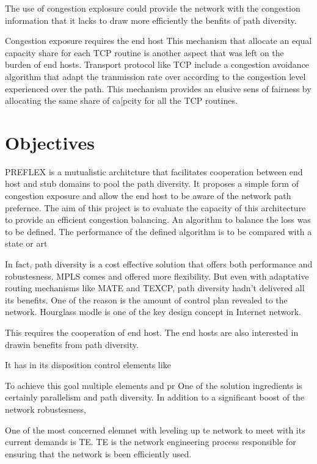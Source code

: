 The use of congestion explosure could provide the network with the congestion information that it lacks to draw more efficiently the benfits of path diversity. 

Congestion exposure requires the end host 
This mechanism that allocate an equal capacity share for each TCP routine
is another aspect that was left on the burden of end hosts. Transport protocol like TCP include a congestion avoidance algorithm that adapt the tranmission rate over according to the congestion level experienced over the path. This mechanism provides an elusive sens of fairness by allocating the same share of ca[pcity for all the TCP routines. 

\section{Objectives}

PREFLEX is a mutualistic architcture that facilitates cooperation between end host and stub domains to pool the path diversity. It proposes a simple form of congestion exposure and allow the end host to be aware of the network path prefernce. The aim of this project is to evaluate the capacity of this architecture to provide an efficient congestion balancing. An algorithm to balance the loss was to be defined.
The performance of the defined algorithm is to be compared with a state or art 
 
In fact, path diversity is a cost effective solution that offers both performance and robustesness. 
MPLS comes and offered more flexibility. But even with adaptative routing mechanisms like MATE and TEXCP, path diversity hadn't delivered all its benefits. One of the reason is the amount of control plan revealed to the network. Hourglass modle is one of the key design concept in Internet network. 

This requires the cooperation of end host. The end hosts are also interested in drawin benefits from path diversity.
 
It has in its disposition control elements like 

To achieve this goal multiple elements and pr
One of the solution ingredients is certainly parallelism and path diversity. In addition to a significant boost of the network robustesness, 

One of the most concerned elemnet with leveling up te network to meet with its current demands is TE. TE is the network engineering process responsible for ensuring that the network is been efficiently used. 


